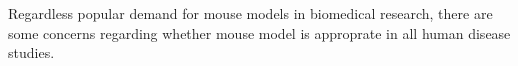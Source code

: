 
Regardless popular demand for mouse models in biomedical research, there are some concerns regarding whether mouse model is approprate in all human disease studies. 